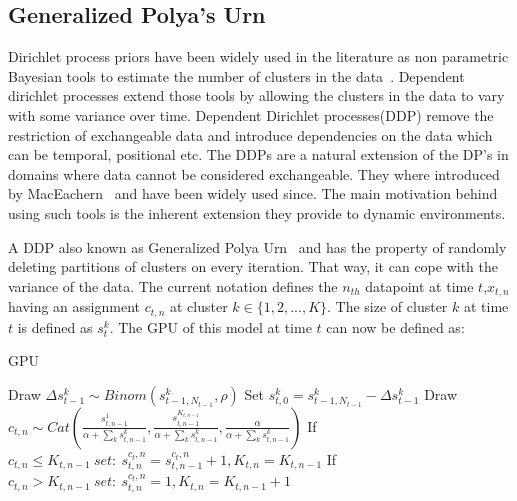 \documentclass[twoside,hidelinks]{article}
\begin{document}
\subsection{Generalized Polya's Urn}

Dirichlet process priors have been widely used in the literature as non parametric Bayesian tools to estimate the number of clusters in the data~\cite{antoniak}. Dependent dirichlet processes extend those tools by allowing the clusters in the data to vary with some variance over time. Dependent Dirichlet processes(DDP) remove the restriction of exchangeable data and introduce dependencies on the data which can be temporal, positional etc. The DDPs are a natural extension of the DP's in domains where data cannot be considered exchangeable. They where introduced by MacEachern~\cite{theory:ddp} and have been widely used since. The main motivation behind using such tools is the inherent extension they provide to dynamic environments.

A DDP also known as Generalized Polya Urn~\cite{caron} and has the property of randomly deleting partitions of clusters on every iteration. That way, it can cope with the variance of the data. The current notation defines the $n_{th}$ datapoint at time $t$,$x_{t,n}$ having an assignment $c_{t,n}$ at cluster $k \in \{1,2,..., K\} $. The size of cluster $k$ at time $t$ is defined as $s_t^k$. The GPU of this model at time $t$ can now be defined as:



\begin{algorithm}
  \caption{GPU}\label{GPU}
  \begin{algorithmic}[1]

	      \State Draw $\Delta s_{t-1}^k \sim Binom(s_{t-1,N_{t-1}}^k, \rho) $ 
	      \State Set $s_{t,0}^{k} = s_{t-1,N_{t-1}}^{k} -\Delta s_{t-1}^k$
      \EndFor
      	    \State Draw $c_{t,n} \sim Cat( \frac{ s_{t,n-1}^{1} }{\alpha + \sum_k s_{t,n-1}^{k} }, \frac{ s_{t,n-1}^{K_{t,n-1}} }{\alpha + \sum_k s_{t,n-1}^{k} } , \frac{ \alpha}{\alpha + \sum_k s_{t,n-1}^{k} }) $
      	    \State If $c_{t,n} \leq K_{t,n-1}\ set:\ s_{t,n}^{c_t,n} = s_{t,n-1}^{c_t,n} + 1 , K_{t,n} = K_{t,n-1}$
      	    \State If $c_{t,n} > K_{t,n-1}\ set:\ s_{t,n}^{c_t,n} = 1 , K_{t,n} = K_{t,n-1} + 1$
      \EndFor
    \EndProcedure
  \end{algorithmic}
\end{algorithm}
\end{document}
